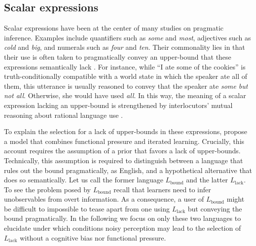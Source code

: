 \documentclass[10pt,a4paper]{article}
\begin{document}
\subsection{Scalar expressions}
Scalar expressions have been at the center of many studies on pragmatic inference. Examples
include quantifiers such as {\em some} and {\em most}, adjectives such as {\em cold} and {\em
  big}, and numerals such as {\em four} and {\em ten}. Their commonality lies in that
their use is often taken to pragmatically convey an upper-bound that these expressions
semantically lack \citep{horn:1972,gazdar:1979}. For instance, while ``I ate some of the
  cookies'' is truth-conditionally compatible with a world state in which the speaker ate
all of them, this utterance is usually reasoned to convey that the speaker ate {\em some but
  not all}. Otherwise, she would have used {\em all}. In this way, the
meaning of a scalar expression lacking an upper-bound is strengthened by interlocutors' mutual reasoning
about rational language use \citep{grice:1975}.

To explain the selection for a lack of upper-bounds in these expressions, \citet{brochhagen+etal:2016:CogSci} propose a model that combines functional pressure and iterated learning.  Crucially, this account requires the assumption of a prior that favors a lack of upper-bounds. Technically, this assumption is required to distinguish between a language that rules out the bound pragmatically, as English, and a hypothetical alternative that does so semantically. Let us call the former language $L_{\text{bound}}$ and the latter $L_{\text{lack}}$. To see the problem posed by $L_{\text{bound}}$ recall that learners need to infer unobservables from overt information. As a consequence, a user of $L_{\text{bound}}$ might be difficult to impossible to tease apart from one using $L_{\text{lack}}$ but conveying the bound pragmatically. In the following we focus on only these two languages to elucidate under which conditions noisy perception may lead to the selection of $L_{\text{lack}}$ without a cognitive bias nor functional pressure.
\end{document}
